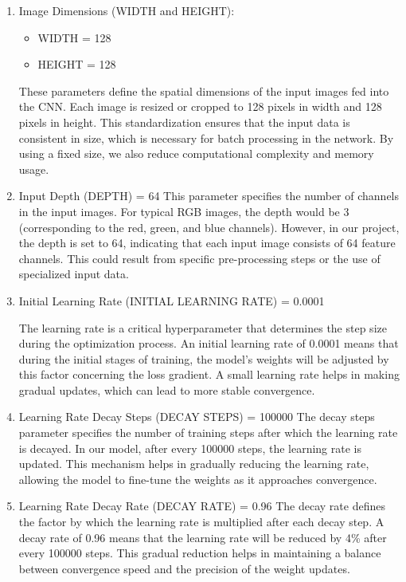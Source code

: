 \begin{enumerate}
    \item Image Dimensions (WIDTH and HEIGHT):
        \begin{itemize}
            \item WIDTH = 128
            \item HEIGHT = 128
        \end{itemize}
         These parameters define the spatial dimensions of the input images fed into the CNN. Each image is resized or cropped to 128 pixels in width and 128 pixels in height. This standardization ensures that the input data is consistent in size, which is necessary for batch processing in the network. By using a fixed size, we also reduce computational complexity and memory usage.
    \item Input Depth (DEPTH) = 64
    This parameter specifies the number of channels in the input images. For typical RGB images, the depth would be 3 (corresponding to the red, green, and blue channels). However, in our project, the depth is set to 64, indicating that each input image consists of 64 feature channels. This could result from specific pre-processing steps or the use of specialized input data.
    \item Initial Learning Rate (INITIAL LEARNING RATE)  = 0.0001

    The learning rate is a critical hyperparameter that determines the step size during the optimization process. An initial learning rate of 0.0001 means that during the initial stages of training, the model's weights will be adjusted by this factor concerning the loss gradient. A small learning rate helps in making gradual updates, which can lead to more stable convergence.
    \item Learning Rate Decay Steps (DECAY STEPS) = 100000
    The decay steps parameter specifies the number of training steps after which the learning rate is decayed. In our model, after every 100000 steps, the learning rate is updated. This mechanism helps in gradually reducing the learning rate, allowing the model to fine-tune the weights as it approaches convergence.
    \item Learning Rate Decay Rate (DECAY RATE) = 0.96
    The decay rate defines the factor by which the learning rate is multiplied after each decay step. A decay rate of 0.96 means that the learning rate will be reduced by 4\% after every 100000 steps. This gradual reduction helps in maintaining a balance between convergence speed and the precision of the weight updates.
\end{enumerate}

